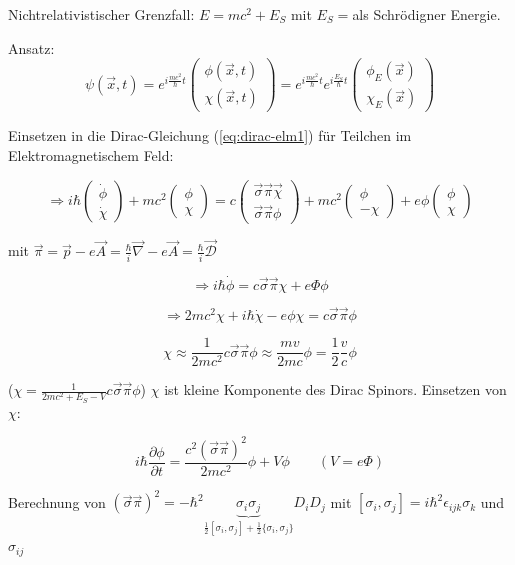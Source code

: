 Nichtrelativistischer Grenzfall: \(E=mc^2+E_S\) mit \(E_S=\)als Schrödigner Energie.

Ansatz: 
\[\psi(\vec x,t) = e^{i\frac{mc^2}{\hbar}t}\begin{pmatrix}\phi(\vec x,t)\\\chi(\vec x,t)\end{pmatrix} =  e^{i\frac{mc^2}{\hbar}t}  e^{i\frac{E_S}{\hbar}t} \begin{pmatrix}\phi_E(\vec x)\\\chi_E(\vec x)\end{pmatrix}\]

Einsetzen in die Dirac-Gleichung (\ref{eq:dirac-elm1}) für Teilchen im Elektromagnetischem Feld:

\[\Rightarrow i\hbar\begin{pmatrix}\dot \phi\\ \dot\chi\end{pmatrix} + mc^2\begin{pmatrix} \phi\\ \chi\end{pmatrix} = c \begin{pmatrix}\vec \sigma \vec \pi \vec \chi\\ \vec \sigma \vec \pi \phi\end{pmatrix}+mc^2\begin{pmatrix} \phi\\ -\chi\end{pmatrix}+e\phi \begin{pmatrix} \phi\\ \chi\end{pmatrix}\]

mit \(\vec\pi = \vec p -e\vec A = \frac{\hbar}{i}\vec \nabla-e\vec A= \frac{\hbar}{i}\vec{\mathcal D} \)

\[\Rightarrow i\hbar\dot\phi = c \vec\sigma\vec\pi\chi + e\Phi \phi\]

\[\Rightarrow  2mc^2\chi+i\hbar \dot\chi - e\phi \chi = c\vec\sigma\vec\pi\phi\]


\[\chi \approx \frac{1}{2mc^2} c\vec\sigma\vec\pi\phi\approx \frac{mv}{2mc}\phi = \frac{1}{2}\frac{v}{c}\phi\]

(\(\chi = \frac{1}{2mc^2+E_S-V}c\vec\sigma\vec\pi\phi\)) \(\chi\) ist kleine Komponente des Dirac Spinors. Einsetzen von \(\chi\):

\[i\hbar \frac{\partial \phi}{\partial t} = \frac{c^2(\vec\sigma\vec\pi)^2}{2mc^2}\phi+V\phi\qquad (V=e\Phi)\]

Berechnung von \((\vec\sigma\vec\pi)^2=-\hbar^2\underbrace{\sigma_i\sigma_j}_{\frac{1}{2}[\sigma_i,\sigma_j]+\frac{1}{2}\{\sigma_i,\sigma_j\}}D_iD_j\) mit \([\sigma_i,\sigma_j]=i\hbar^2\epsilon_{ijk}\sigma_k \) und \( \sigma_{ij}\)

